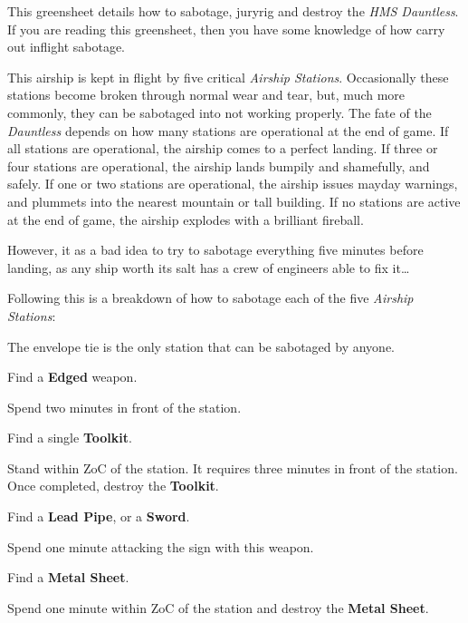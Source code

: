 \documentclass[green]{airship}
\begin{document}
\name{\gSabotage{}}

This greensheet details how to sabotage, juryrig and destroy the {\it HMS Dauntless}. If you are reading this greensheet, then you have some knowledge of how carry out inflight sabotage.

This airship is kept in flight by five critical {\it Airship Stations}. Occasionally these stations become broken through normal wear and tear, but, much more commonly, they can be sabotaged into not working properly. The fate of the {\it Dauntless} depends on how many stations are operational at the end of game. If all stations are operational, the airship comes to a perfect landing. If three or four stations are operational, the airship lands bumpily and shamefully, and safely. If one or two stations are operational, the airship issues mayday warnings, and plummets into the nearest mountain or tall building. If no stations are active at the end of game, the airship explodes with a brilliant fireball.

However, it as a bad idea to try to sabotage everything five minutes before landing, as any ship worth its salt has a crew of engineers able to fix it{\ldots}

Following this is a breakdown of how to sabotage each of the five {\it Airship Stations}:

\begin{enum}
  \item The envelope tie is the only station that can be sabotaged by anyone.
  \item Find a {\bf Edged} weapon.
  \item Spend two minutes in front of the station.
\end{enum}

\begin{enum}
  \item Find a single {\bf Toolkit}.
  \item Stand within ZoC of the station. It requires three minutes in front of the station.  Once completed, destroy the {\bf Toolkit}.
\end{enum}

\begin{enum}[Boiler]
  \item Find a {\bf Lead Pipe}, or a {\bf Sword}.
  \item Spend one minute attacking the sign with this weapon.
  \item Find a {\bf Metal Sheet}.
  \item Spend one minute within ZoC of the station and destroy the {\bf Metal Sheet}.
\end{enum}
\end{document}
